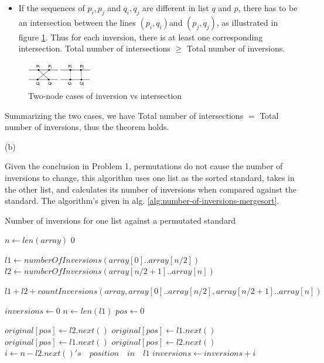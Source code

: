 \documentclass{article}
\begin{document}
\begin{description}
\begin{itemize}
  \item
  If the sequences of $p_i, p_j$ and $q_i, q_j$ are different in list $q$ and $p$, there has to be an intersection between the lines $(p_i, q_i)$and $(p_j, q_j)$, as illustrated in figure \ref{fig:pb2}. Thus for each inversion, there is at least one corresponding intersection. Total number of intersections $\geq$ Total number of inversions.

  \end{itemize}

  \begin{figure}[h]
  \centering
  \includegraphics[width=0.25\textwidth]{pb2}
  \caption{Two-node cases of inversion vs intersection}
  \label{fig:pb2}
  \end{figure}

  Summarizing the two cases, we have Total number of intersections $ = $ Total number of inversions, thus the theorem holds. 

  (b)

  Given the conclusion in Problem 1, permutations do not cause the number of inversions to change, this algorithm uses one list as the sorted standard, takes in the other list, and calculates its number of inversions when compared against the standard. The algorithm's given in alg. \ref{alg:number-of-inversions-mergesort}.
  
  \begin{algorithm}[h]
  \caption{Number of inversions for one list against a permutated standard}
  \label{alg:number-of-inversions-mergesort}
    \begin{algorithmic}[1]
      \State $n \gets len(array)$
        \State \Return $0$
      \EndIf
      
      \State $l1 \gets numberOfInversions(array[0]..array[n/2])$
      \State $l2 \gets numberOfInversions(array[n/2+1]..array[n])$

      \State \Return $l1 + l2 + countInversions(array, array[0]..array[n/2], array[n/2+1]..array[n])$
    \EndFunction

      \State $inversions \gets 0$
      \State $n \gets len(l1)$
      \State $pos \gets 0$

          \State $original[pos] \gets l2.next()$
          \State $original[pos] \gets l1.next()$
          \State $original[pos] \gets l1.next()$
        \Else
          \State $original[pos] \gets l2.next()$
          \State $i \gets n - l2.next()'s \quad position \quad in \quad l1$
          \State $inversions \gets inversions + i$
        \EndIf
        

\end{algorithmic}
\end{algorithm}
\end{description}
\end{document}
